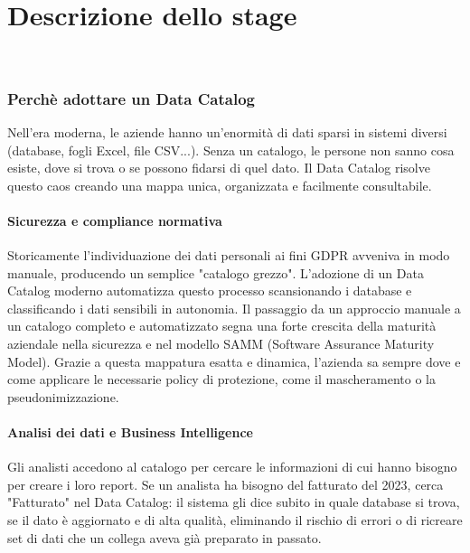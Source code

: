 \chapter{Descrizione dello stage}
\label{cap:descrizione-stage}

\\


\subsection{Perchè adottare un Data Catalog}
Nell'era moderna, le aziende hanno un'enormità di dati sparsi in sistemi diversi (database, fogli Excel, file CSV...). Senza un catalogo, le persone 
non sanno cosa esiste, dove si trova o se possono fidarsi di quel dato. Il Data Catalog risolve questo caos creando una mappa unica, organizzata e facilmente consultabile.

\subsubsection{Sicurezza e compliance normativa}
Storicamente l'individuazione dei dati personali ai fini GDPR avveniva in modo manuale, producendo un semplice "catalogo grezzo". 
L'adozione di un Data Catalog moderno automatizza questo processo scansionando i database e classificando i dati sensibili in autonomia.
Il passaggio da un approccio manuale a un catalogo completo e automatizzato segna una forte crescita della maturità aziendale nella sicurezza e nel modello SAMM (Software Assurance Maturity Model). 
Grazie a questa mappatura esatta e dinamica, l'azienda sa sempre dove e come applicare le necessarie policy di protezione, come il mascheramento o la pseudonimizzazione.

\subsubsection{Analisi dei dati e Business Intelligence}
Gli analisti accedono al catalogo per cercare le informazioni di cui hanno bisogno per creare i loro report. 
Se un analista ha bisogno del fatturato del 2023, cerca "Fatturato" nel Data Catalog: il sistema gli dice subito in quale 
database si trova, se il dato è aggiornato e di alta qualità, eliminando il rischio di errori o di ricreare set di dati che un collega aveva già preparato in passato.

